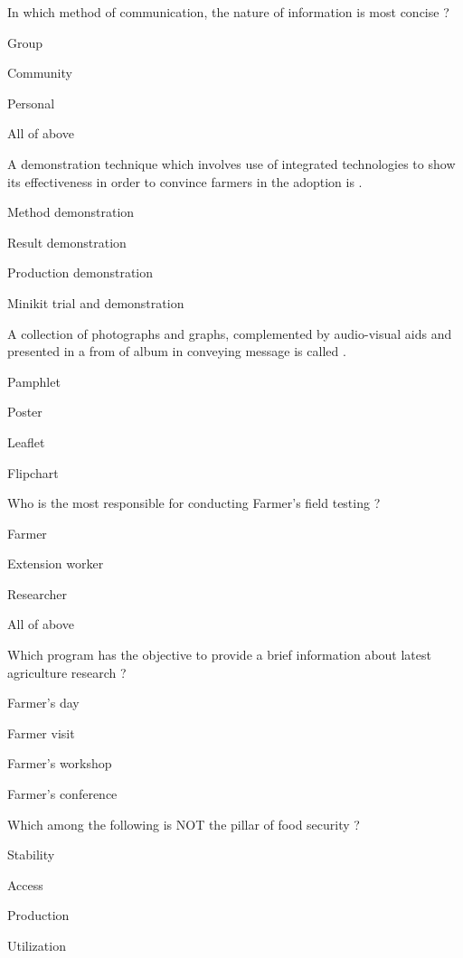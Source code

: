 \begin{questions}
\question In which method of communication, the nature of information is most concise ?
\begin{items}
\item Group
\item Community
\item* Personal
\item All of above
\end{items}

\question A demonstration technique which involves use of integrated technologies to show its effectiveness in order to convince farmers in the adoption is \fillin[][3cm].
\begin{items}
\item Method demonstration
\item Result demonstration
\item* Production demonstration
\item Minikit trial and demonstration
\end{items}

\question A collection of photographs and graphs, complemented by audio-visual aids and presented in a from of album in conveying message is called \fillin[][3cm].
\begin{items}
\item Pamphlet
\item Poster
\item Leaflet
\item* Flipchart
\end{items}

\question Who is the most responsible for conducting Farmer's field testing ?
\begin{items}
\item Farmer
\item Extension worker
\item Researcher
\item* All of above
\end{items}

\question Which program has the objective to provide a brief information about latest agriculture research ?
\begin{items}
\item* Farmer's day
\item Farmer visit
\item Farmer's workshop
\item Farmer's conference
\end{items}

\question Which among the following is NOT the pillar of food security ?
\begin{items}
\item Stability
\item Access
\item* Production
\item Utilization
\end{items}


\end{questions}
